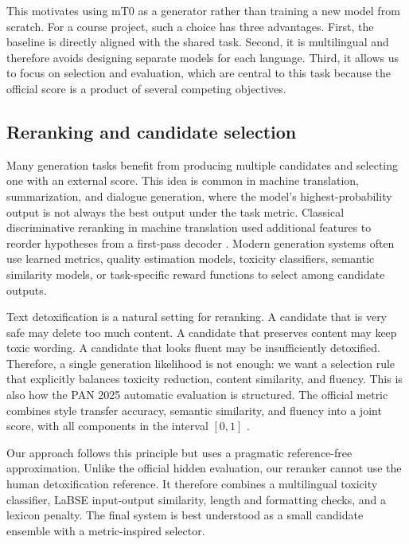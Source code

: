 \documentclass{article}
\begin{document}
This motivates using mT0 as a generator rather than training a new model from scratch. For a course project, such a choice has three advantages. First, the baseline is directly aligned with the shared task. Second, it is multilingual and therefore avoids designing separate models for each language. Third, it allows us to focus on selection and evaluation, which are central to this task because the official score is a product of several competing objectives.

\subsection{Reranking and candidate selection}

Many generation tasks benefit from producing multiple candidates and selecting one with an external score. This idea is common in machine translation, summarization, and dialogue generation, where the model's highest-probability output is not always the best output under the task metric. Classical discriminative reranking in machine translation used additional features to reorder hypotheses from a first-pass decoder \cite{shen2004reranking}. Modern generation systems often use learned metrics, quality estimation models, toxicity classifiers, semantic similarity models, or task-specific reward functions to select among candidate outputs.

Text detoxification is a natural setting for reranking. A candidate that is very safe may delete too much content. A candidate that preserves content may keep toxic wording. A candidate that looks fluent may be insufficiently detoxified. Therefore, a single generation likelihood is not enough: we want a selection rule that explicitly balances toxicity reduction, content similarity, and fluency. This is also how the PAN 2025 automatic evaluation is structured. The official metric combines style transfer accuracy, semantic similarity, and fluency into a joint score, with all components in the interval $[0,1]$ \cite{pan25taskpage,dementieva2025pantextdetox}.

Our approach follows this principle but uses a pragmatic reference-free approximation. Unlike the official hidden evaluation, our reranker cannot use the human detoxification reference. It therefore combines a multilingual toxicity classifier, LaBSE input-output similarity, length and formatting checks, and a lexicon penalty. The final system is best understood as a small candidate ensemble with a metric-inspired selector.
\end{document}
